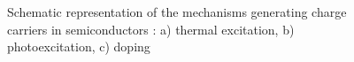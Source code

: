 \begin{figure}[h]
\centering

\caption{Schematic representation of the mechanisms generating charge carriers in semiconductors \citep{finklea1983}: 
a) thermal excitation, b) photoexcitation, c) doping}
\label{fig_excitation_carrier}
\end{figure}
